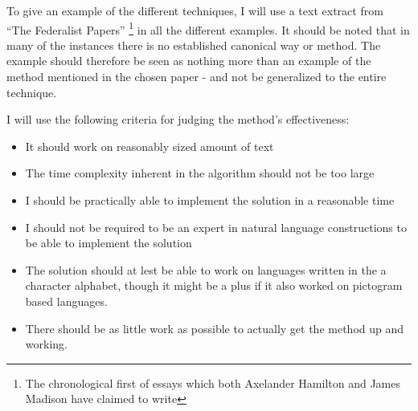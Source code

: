 To give an example of the different techniques, I will use a text extract from ``The Federalist Papers'' \cite{federalist} \footnote{The chronological first of essays which both Axelander Hamilton and James Madison have claimed to write} in all the different examples. It should be noted that in many of the instances there is no established canonical way or method. The example should therefore be seen as nothing more than an example of the method mentioned in the chosen paper - and not be generalized to the entire technique.

I will use the following criteria for judging the method's effectiveness:
\begin{itemize}
\item It should work on reasonably sized amount of text
\item The time complexity inherent in the algorithm should not be too large
\item I should be practically able to implement the solution in a reasonable time
\item I should not be required to be an expert in natural language constructions to be able to implement the solution
\item The solution should at lest be able to work on languages written in the a character alphabet, though it might be a plus if it also worked on pictogram based languages.
\item There should be as little work as possible to actually get the method up and working.
\end{itemize}

